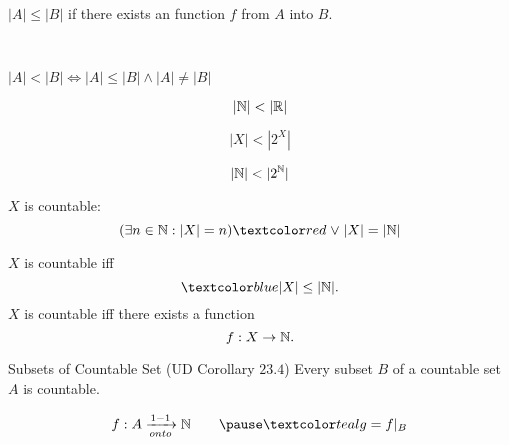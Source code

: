 \begin{frame}{}
\end{frame}

\begin{frame}{}
  \begin{definition}[$|A| \le |B|$]
    $|A| \le |B|$ if there exists an  function $f$ from $A$ into $B$.
  \end{definition}

  \pause
  \vspace{0.80cm}
  \begin{center}
    {} \\[8pt] \pause
    {}
  \end{center}
\end{frame}

\begin{frame}{}
  \begin{definition}[$|A| < |B|$]
    $|A| < |B| \iff |A| \le |B| \land |A| \neq |B|$ 
  \end{definition}

  \pause
  \[
    |\mathbb{N}| < |\mathbb{R}|
  \]

  \[
    |X| < |2^{X}|
  \]

  \[
    |\mathbb{N}| < |2^{\mathbb{N}}|
  \]
\end{frame}

\begin{frame}{}
  \begin{definition}
    $X$ is countable:
    \[
      (\exists n \in \N: |X| = n) \red{\;\lor\;} |X| = |\N|
    \]
  \end{definition}

  \pause
  \begin{theorem}
    $X$ is countable iff
    \[
      \blue{|X| \le |\N|.}
    \]
    \pause
    $X$ is countable iff there exists a  function
    \[
      f: X \to \mathbb{N}.
    \]
  \end{theorem}

  \pause
  \begin{exampleblock}{Subsets of Countable Set (UD Corollary $23.4$)}
    Every subset $B$ of a countable set $A$ is countable.
  \end{exampleblock}

  \pause
  \[
    f: A \xrightarrow[onto]{1-1} \N \qquad \pause \teal{g = f|_{B}}
  \]
\end{frame}

